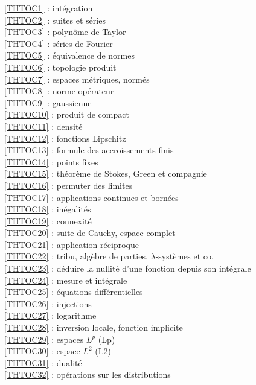\ref {THTOC1} : intégration\\
\ref {THTOC2} : suites et séries\\
\ref {THTOC3} : polynôme de Taylor\\
\ref {THTOC4} : séries de Fourier\\
\ref {THTOC5} : équivalence de normes\\
\ref {THTOC6} : topologie produit\\
\ref {THTOC7} : espaces métriques, normés\\
\ref {THTOC8} : norme opérateur\\
\ref {THTOC9} : gaussienne\\
\ref {THTOC10} : produit de compact\\
\ref {THTOC11} : densité\\
\ref {THTOC12} : fonctions Lipschitz\\
\ref {THTOC13} : formule des accroissements finis\\
\ref {THTOC14} : points fixes\\
\ref {THTOC15} : théorème de Stokes, Green et compagnie\\
\ref {THTOC16} : permuter des limites\\
\ref {THTOC17} : applications continues et bornées\\
\ref {THTOC18} : inégalités\\
\ref {THTOC19} : connexité\\
\ref {THTOC20} : suite de Cauchy, espace complet\\
\ref {THTOC21} : application réciproque\\
\ref {THTOC22} : tribu, algèbre de parties, \( \lambda \)-systèmes et co.\\
\ref {THTOC23} : déduire la nullité d'une fonction depuis son intégrale\\
\ref {THTOC24} : mesure et intégrale\\
\ref {THTOC25} : équations différentielles\\
\ref {THTOC26} : injections\\
\ref {THTOC27} : logarithme\\
\ref {THTOC28} : inversion locale, fonction implicite\\
\ref {THTOC29} : espaces \( L^p\) (Lp)\\
\ref {THTOC30} : espace \( L^2\) (L2)\\
\ref {THTOC31} : dualité\\
\ref {THTOC32} : opérations sur les distributions\\
